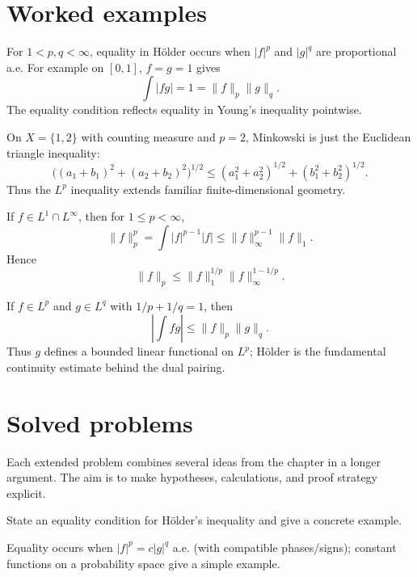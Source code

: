\section{Worked examples}

\begin{example}\label{ex:iii07-worked-01}
For \(1<p,q<\infty\), equality in Hölder occurs when
\(|f|^p\) and \(|g|^q\) are proportional a.e. For example on \([0,1]\),
\(f=g=1\) gives
\[
\int|fg|=1=\|f\|_p\|g\|_q.
\]
The equality condition reflects equality in Young's inequality pointwise.
\end{example}

\begin{example}\label{ex:iii07-worked-02}
On \(X=\{1,2\}\) with counting measure and \(p=2\), Minkowski is just the
Euclidean triangle inequality:
\[
\bigl((a_1+b_1)^2+(a_2+b_2)^2\bigr)^{1/2}
\le (a_1^2+a_2^2)^{1/2}+(b_1^2+b_2^2)^{1/2}.
\]
Thus the \(L^p\) inequality extends familiar finite-dimensional geometry.
\end{example}

\begin{example}\label{ex:iii07-worked-03}
If \(f\in L^1\cap L^\infty\), then for \(1\le p<\infty\),
\[
\|f\|_p^p=\int |f|^{p-1}|f|
\le \|f\|_\infty^{p-1}\|f\|_1.
\]
Hence
\[
\|f\|_p\le\|f\|_1^{1/p}\|f\|_\infty^{1-1/p}.
\]
\end{example}

\begin{example}\label{ex:iii07-worked-04}
If \(f\in L^p\) and \(g\in L^q\) with \(1/p+1/q=1\), then
\[
\left|\int fg\right|\le\|f\|_p\|g\|_q.
\]
Thus \(g\) defines a bounded linear functional on \(L^p\); Hölder is the
fundamental continuity estimate behind the dual pairing.
\end{example}

\section{Solved problems}
Each extended problem combines several ideas from the chapter in a longer argument. The aim is to make hypotheses, calculations, and proof strategy explicit.

\begin{problem}\label{prob:iii07-problem-01}
State an equality condition for Hölder's inequality and give a concrete example.
\end{problem}
\begin{solution}
Equality occurs when \(|f|^p=c|g|^q\) a.e. (with compatible phases/signs);
constant functions on a probability space give a simple example.
\end{solution}

